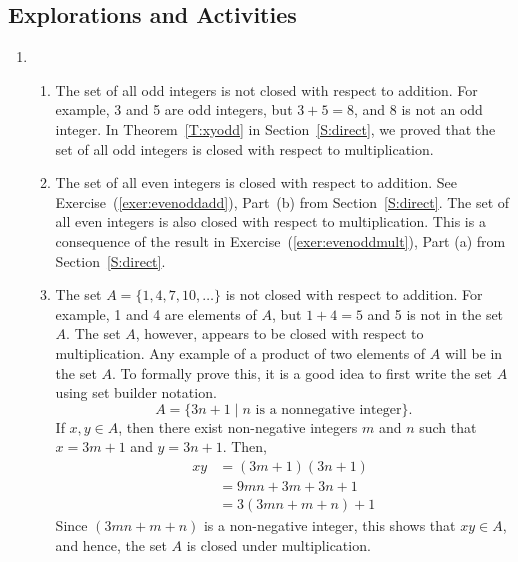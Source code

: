 \subsection*{Explorations and Activities}
\setcounter{oldenumi}{\theenumi}
\begin{enumerate} \setcounter{enumi}{\theoldenumi}
\item \begin{enumerate}
\item The set of all odd integers is not closed with respect to addition. For example, 3 and 5 are odd integers,
but $3 + 5 = 8$, and 8 is not an odd integer. In Theorem~\ref{T:xyodd} in Section~\ref{S:direct}, we proved that the set of all odd integers is closed with respect to multiplication.

\item The set of all even integers is closed with respect to addition. See Exercise~(\ref{exer:evenoddadd}), Part~(b) from Section~\ref{S:direct}. The set of all even integers is also closed with respect to multiplication. This is a consequence
of the result in Exercise~(\ref{exer:evenoddmult}), Part (a) from Section~\ref{S:direct}.

\item The set $A = \{1, 4, 7, 10,\ldots \}$ is not closed with respect to addition. For example, 1 and 4 are
elements of $A$, but $1 + 4 = 5$ and 5 is not in the set $A$. The set $A$, however, appears to be closed with
respect to multiplication. Any example of a product of two elements of $A$ will be in the set $A$. To
formally prove this, it is a good idea to first write the set $A$ using set builder notation.
\[
A = \{3n + 1 \mid n \text{ is a nonnegative integer} \}.
\]
If $x, y \in A$, then there exist non-negative integers $m$ and $n$ such that $x = 3m + 1$ and $y = 3n + 1$.
Then,
\begin{align*}
xy &= (3m + 1)(3n + 1) \\
   &= 9mn + 3m + 3n + 1 \\
   &= 3(3mn + m + n ) + 1
\end{align*}
Since $(3mn + m + n)$ is a non-negative integer, this shows that $xy \in A$, and hence, the set $A$ is closed under multiplication.


\end{enumerate}
\end{enumerate}
